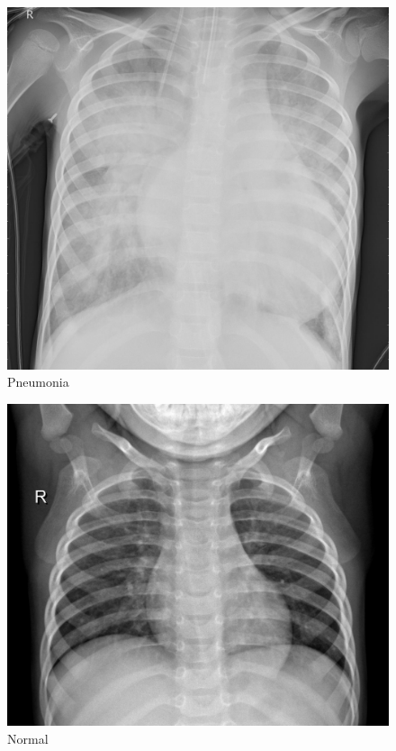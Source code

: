 \documentclass[12pt]{article}
\begin{document}
\begin{figure}

{\centering \includegraphics[width=0.75\linewidth,height=0.25\textheight]{images/pneumonia} 

}

\caption{Pneumonia}\label{fig:sample-fig3}
\end{figure}

\begin{figure}

{\centering \includegraphics[width=0.75\linewidth,height=0.25\textheight]{images/normal} 

}

\caption{Normal}\label{fig:sample-fig4}
\end{figure}
\end{document}
